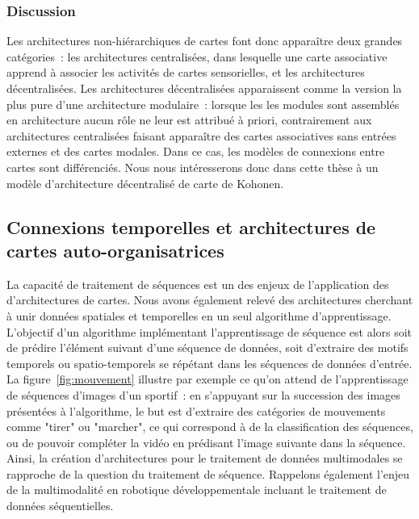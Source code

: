 \documentclass[../main]{subfiles}
\begin{document}
\subsubsection{Discussion}

Les architectures non-hiérarchiques de cartes font donc apparaître deux grandes catégories~: les architectures centralisées, dans lesquelle une carte associative apprend à associer les activités de cartes sensorielles, et les architectures décentralisées.
Les architectures décentralisées apparaissent comme la version la plus pure d'une architecture modulaire~: lorsque les les modules sont assemblés en architecture aucun rôle ne leur est attribué à priori, contrairement aux architectures centralisées faisant apparaître des cartes associatives sans entrées externes et des cartes modales. Dans ce cas, les modèles de connexions entre cartes sont différenciés.
Nous nous intéresserons donc dans cette thèse à un modèle d'architecture décentralisé de carte de Kohonen.

\subsection{Connexions temporelles et architectures de cartes auto-organisatrices}

La capacité de traitement de séquences est un des enjeux de l'application des d'architectures de cartes. Nous avons également relevé des architectures cherchant à unir données spatiales et temporelles en un seul algorithme d'apprentissage. L'objectif d'un algorithme implémentant l'apprentissage de séquence est alors soit de prédire l'élément suivant d'une séquence de données, soit d'extraire des motifs temporels ou spatio-temporels se répétant dans les séquences de données d'entrée. 
La figure~\ref{fig:mouvement} illustre par exemple ce qu'on attend de l'apprentissage de séquences d'images d'un sportif~: en s'appuyant sur la succession des images présentées à l'algorithme, le but est d'extraire des catégories de mouvements comme "tirer" ou "marcher", ce qui correspond à de la classification des séquences, ou de pouvoir compléter la vidéo en prédisant l'image suivante dans la séquence.
Ainsi, la création d'architectures pour le traitement de données multimodales se rapproche de la question du traitement de séquence. Rappelons également l'enjeu de la multimodalité en robotique développementale incluant le traitement de données séquentielles.
\end{document}
